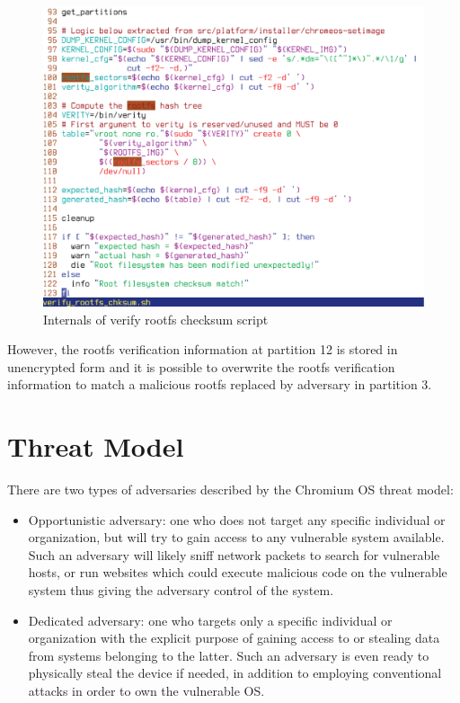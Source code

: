 \documentclass[11pt]{article}
\begin{document}
\begin{figure}[htbp]
  \centering
   \includegraphics[width=\columnwidth]{Figure/verify-rootfs-checksum.eps}
\caption{\small{Internals of verify rootfs checksum script}}
\label{fig:verify-rootfs-checksum}
\end{figure}

However, the rootfs verification information at partition 12 is stored in unencrypted form and it is possible to overwrite the rootfs verification information to match a malicious rootfs replaced by adversary in partition 3. 

\section{Threat Model}


There are two types of adversaries described by the Chromium OS
threat model:
\begin{itemize}
\item Opportunistic adversary: one who does not target
any specific individual or organization, but will try to gain
access to any vulnerable system available. Such an adversary will
likely sniff network packets to search for vulnerable hosts, or
run websites which could execute malicious code on the vulnerable
system thus giving the adversary control of the system.
\item Dedicated adversary: one who targets only a specific individual
or organization with the explicit purpose of gaining access to or
stealing data from systems belonging to the latter. Such an adversary
is even ready to physically steal the device if needed, in addition to
employing conventional attacks in order to own the vulnerable OS.
\end{itemize}
\end{document}
